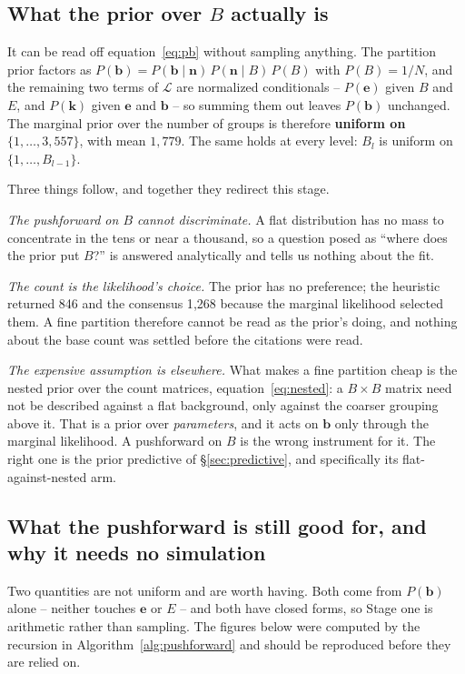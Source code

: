\documentclass[11pt]{article}
\begin{document}
\subsection{What the prior over $B$ actually is}

It can be read off equation~\eqref{eq:pb} without sampling anything. The
partition prior factors as $P(\bm{b}) = P(\bm{b} \mid \bm{n})\,P(\bm{n} \mid
B)\,P(B)$ with $P(B) = 1/N$, and the remaining two terms of $\mathcal{L}$ are
normalized conditionals -- $P(\bm{e})$ given $B$ and $E$, and $P(\bm{k})$
given $\bm{e}$ and $\bm{b}$ -- so summing them out leaves $P(\bm{b})$
unchanged. The marginal prior over the number of groups is therefore
\textbf{uniform on $\{1, \dots, 3{,}557\}$}, with mean $1{,}779$. The same
holds at every level: $B_l$ is uniform on $\{1, \dots, B_{l-1}\}$.

Three things follow, and together they redirect this stage.

\emph{The pushforward on $B$ cannot discriminate.} A flat distribution has no
mass to concentrate in the tens or near a thousand, so a question posed as
``where does the prior put $B$?'' is answered analytically and tells us
nothing about the fit.

\emph{The count is the likelihood's choice.} The prior has no preference; the
heuristic returned 846 and the consensus 1{,}268 because the marginal
likelihood selected them. A fine partition therefore cannot be read as the
prior's doing, and nothing about the base count was settled before the
citations were read.

\emph{The expensive assumption is elsewhere.} What makes a fine partition cheap
is the nested prior over the count matrices, equation~\eqref{eq:nested}: a
$B \times B$ matrix need not be described against a flat background, only
against the coarser grouping above it. That is a prior over
\emph{parameters}, and it acts on $\bm{b}$ only through the marginal
likelihood. A pushforward on $B$ is the wrong instrument for it. The right one
is the prior predictive of \S\ref{sec:predictive}, and specifically its
flat-against-nested arm.

\subsection{What the pushforward is still good for, and why it needs no
  simulation}

Two quantities are not uniform and are worth having. Both come from
$P(\bm{b})$ alone -- neither touches $\bm{e}$ or $E$ -- and both have
closed forms, so Stage one is arithmetic rather than sampling. The figures
below were computed by the recursion in Algorithm~\ref{alg:pushforward} and
should be reproduced before they are relied on.
\end{document}

